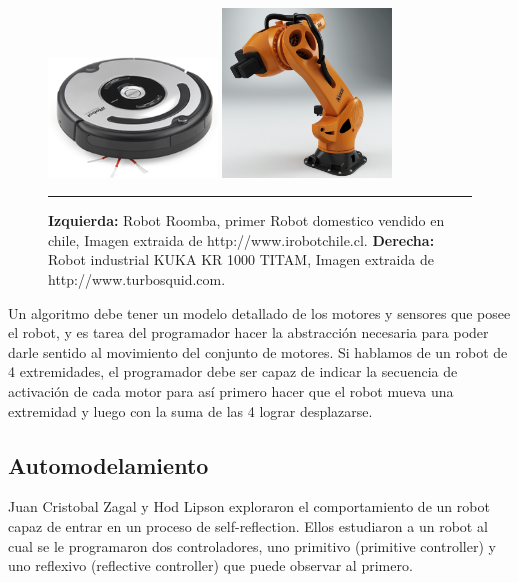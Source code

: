 \begin{figure}[htbp]
	\centering
		\includegraphics[width=0.4\textwidth]{./Figures/roomba.png}
		\includegraphics[width=0.4\textwidth]{./Figures/PR_KR1000_titan_01.jpg}
		\rule{35em}{0.5pt}
	\caption[Roomba y KUKA]{\textbf{Izquierda:} Robot Roomba, primer Robot domestico vendido en chile, Imagen extraida de http://www.irobotchile.cl. \textbf{Derecha:} Robot industrial KUKA KR 1000 TITAM, Imagen extraida de http://www.turbosquid.com.}
	\label{fig:Roomba y KUKA}
\end{figure}

Un algoritmo debe tener un modelo detallado de los motores y sensores que posee el robot, y es tarea del programador hacer la abstracción necesaria para poder darle sentido al movimiento del conjunto de motores. Si hablamos de un robot de 4 extremidades, el programador debe ser capaz de indicar la secuencia de activación de cada motor para así  primero hacer que el robot mueva una extremidad y luego con la suma de las 4 lograr desplazarse.

\subsection{Automodelamiento}

Juan Cristobal Zagal y Hod Lipson \cite{ZagalL09} exploraron el comportamiento de un robot capaz de entrar en un proceso de self-reflection. Ellos estudiaron a un robot al cual se le programaron dos controladores, uno primitivo (primitive controller) y uno reflexivo (reflective controller) que puede observar al primero.

